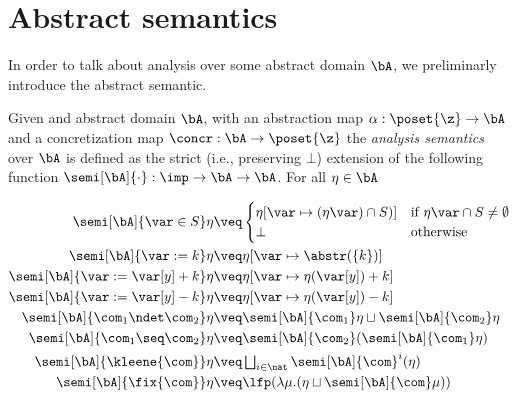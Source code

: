\section{Abstract semantics}
\label{sec:abstractsem}

In order to talk about analysis over some abstract domain \(\bA\), we
preliminarly introduce the abstract semantic.

\begin{definition}
  Given and abstract domain \(\bA\), with an abstraction map
  \({\alpha : \poset{\z} \to \bA}\) and a concretization map
  \({\concr : \bA \to \poset{\z}}\) the \emph{analysis semantics} over
  \(\bA\) is defined as the strict (i.e., preserving \(\bot\))
  extension of the following function
  \({\semi[\bA]{\cdot} : \imp \to \bA \to \bA}\). For all
  \(\eta \in \bA\)

  \begin{align*}
    \semi[\bA]{\var \in S}\eta 
    & \veq  
      \begin{cases}
        \eta[\var \mapsto (\eta\var) \cap S)] & \text{if }\eta\var\cap S\neq \emptyset \\
        \bot & \text{otherwise}
      \end{cases}\\
    \semi[\bA]{\var := k}\eta 
    & \veq \eta[\var \mapsto \abstr(\{k\})]\\
    \semi[\bA]{\var := \var[y] + k}\eta 
    & \veq \eta[\var \mapsto \eta (\var[y]) + k]\\
    \semi[\bA]{\var := \var[y] - k}\eta 
    & \veq \eta[\var \mapsto \eta (\var[y]) - k]\\
    \semi[\bA]{\com_1 \ndet \com_2} \eta
    & \veq \semi[\bA]{\com_1} \eta \sqcup \semi[\bA]{\com_2} \eta\\
    \semi[\bA]{\com_1 \seq \com_2} \eta
    & \veq \semi[\bA]{\com_2} (\semi[\bA]{\com_1} \eta)\\
    \semi[\bA]{\kleene{\com}} \eta
    & \veq \textstyle \bigsqcup_{i \in \nat} \semi[\bA]{\com}^i (\eta)\\
    \semi[\bA]{\fix{\com}} \eta
    & \veq  \lfp(\lambda \mu. (\eta \sqcup \semi[\bA]{\com} \mu))
  \end{align*}
\end{definition}
